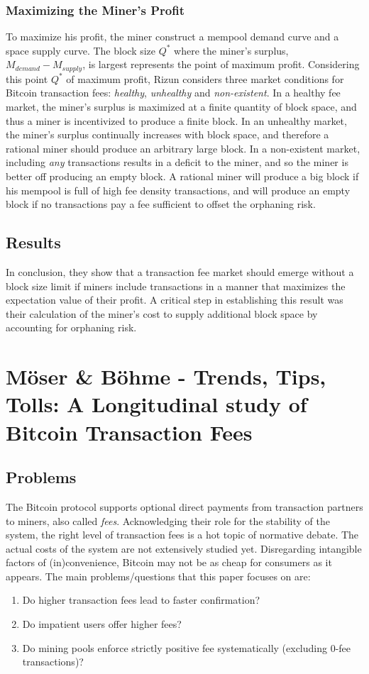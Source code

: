 \documentclass[USenglish]{uit-thesis}
\begin{document}
\subsubsection{Maximizing the Miner's Profit}
To maximize his profit, the miner construct a mempool
demand curve and a space supply curve.
The block size $Q^*$ where the miner's surplus,
$M_{demand} - M_{supply}$, is largest represents
the point of maximum profit. Considering this point $Q^*$ of maximum
profit, Rizun considers three market conditions for Bitcoin transaction
fees: \emph{healthy}, \emph{unhealthy} and \emph{non-existent}.
In a healthy fee market, the miner's surplus is maximized
at a finite quantity of block space, and thus a miner is
incentivized to produce a finite block. In an unhealthy
market, the miner's surplus continually increases with
block space, and therefore a rational miner should produce
an arbitrary large block. In a non-existent market,
including \emph{any} transactions results in a deficit
to the miner, and so the miner is better off
producing an empty block. A rational
miner will produce a big block if his mempool
is full of high fee density transactions, and
will produce an empty block if no transactions pay a fee sufficient
to offset the orphaning risk.

\subsection{Results}
In conclusion, they show that a transaction fee market should
emerge without a block size limit if miners
include transactions in a manner that maximizes
the expectation value of their profit. A
critical step in establishing this result was their
calculation of the miner’s cost to supply
additional block space by accounting for orphaning risk.

\section{Möser \& Böhme - Trends, Tips, Tolls: A Longitudinal
study of Bitcoin Transaction Fees\,\cite{Moser2015}}
\label{sec:moser}
\subsection{Problems}
The Bitcoin protocol supports optional direct payments
from transaction partners to miners, also called \emph{fees}.
Acknowledging their
role for the stability of the system, the right level of
transaction fees is a hot topic of normative debate. The actual
costs of the system are not extensively studied yet. Disregarding
intangible factors of (in)convenience, Bitcoin may not be as cheap for
consumers as it appears. The main problems/questions
that this paper focuses on are:
\begin{enumerate}[noitemsep]
	\item Do higher transaction fees lead to faster confirmation?
	\item Do impatient users offer higher fees?
	\item Do mining pools enforce strictly positive fee systematically
	(excluding $0$-fee transactions)?
\end{enumerate}
\end{document}
